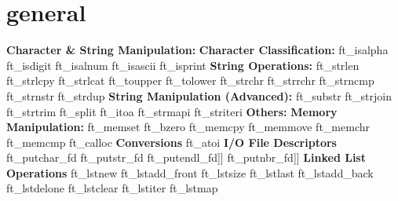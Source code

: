 \chapter{general}
\hypertarget{md_Documentation_2general}{}\label{md_Documentation_2general}
{\bfseries{Character \& String Manipulation\+:}} {\bfseries{Character Classification\+:}} ft\+\_\+isalpha ft\+\_\+isdigit ft\+\_\+isalnum ft\+\_\+isascii ft\+\_\+isprint {\bfseries{String Operations\+:}} ft\+\_\+strlen ft\+\_\+strlcpy ft\+\_\+strlcat ft\+\_\+toupper ft\+\_\+tolower ft\+\_\+strchr ft\+\_\+strrchr ft\+\_\+strncmp ft\+\_\+strnstr ft\+\_\+strdup {\bfseries{String Manipulation (Advanced)\+:}} ft\+\_\+substr ft\+\_\+strjoin ft\+\_\+strtrim ft\+\_\+split ft\+\_\+itoa ft\+\_\+strmapi ft\+\_\+striteri {\bfseries{Others\+:}} {\bfseries{Memory Manipulation\+:}} ft\+\_\+memset ft\+\_\+bzero ft\+\_\+memcpy ft\+\_\+memmove ft\+\_\+memchr ft\+\_\+memcmp ft\+\_\+calloc {\bfseries{Conversions}} ft\+\_\+atoi {\bfseries{I/O File Descriptors}} ft\+\_\+putchar\+\_\+fd ft\+\_\+putstr\+\_\+fd ft\+\_\+putendl\+\_\+fd\mbox{]}\mbox{]} ft\+\_\+putnbr\+\_\+fd\mbox{]}\mbox{]} {\bfseries{Linked List Operations}} ft\+\_\+lstnew ft\+\_\+lstadd\+\_\+front ft\+\_\+lstsize ft\+\_\+lstlast ft\+\_\+lstadd\+\_\+back ft\+\_\+lstdelone ft\+\_\+lstclear ft\+\_\+lstiter ft\+\_\+lstmap 